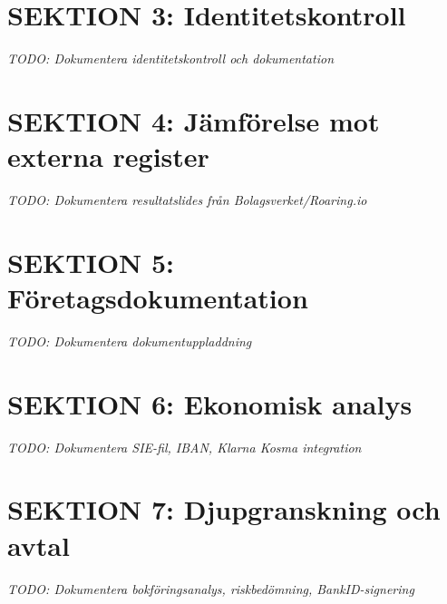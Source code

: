 \documentclass[12pt,a4paper]{article}
\begin{document}
\newpage

\section{SEKTION 3: Identitetskontroll}

\textit{TODO: Dokumentera identitetskontroll och dokumentation}

\section{SEKTION 4: Jämförelse mot externa register}

\textit{TODO: Dokumentera resultatslides från Bolagsverket/Roaring.io}

\section{SEKTION 5: Företagsdokumentation}

\textit{TODO: Dokumentera dokumentuppladdning}

\section{SEKTION 6: Ekonomisk analys}

\textit{TODO: Dokumentera SIE-fil, IBAN, Klarna Kosma integration}

\section{SEKTION 7: Djupgranskning och avtal}

\textit{TODO: Dokumentera bokföringsanalys, riskbedömning, BankID-signering}
\end{document}
